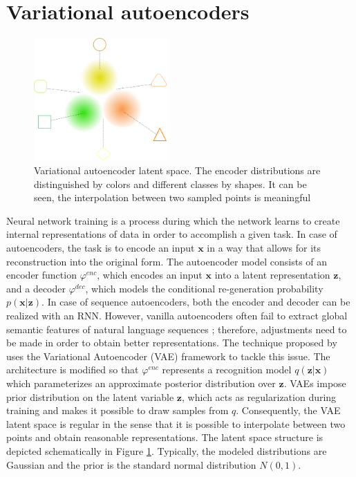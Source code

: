 \section{Variational autoencoders}
\label{background:vae}
\begin{figure}[t]
    \centering
    \includegraphics[width=0.46\textwidth]{images/VAE.png}
    \caption{Variational autoencoder latent space. The encoder distributions are distinguished by colors and different classes by shapes. It can be seen, the interpolation between two sampled points is meaningful}
    \label{fig:vae}
\end{figure}
Neural network training is a process during which the network learns to create internal representations of data in order to accomplish a given task.
In case of autoencoders, the task is to encode an input $\mathbf{x}$ in a way that allows for its reconstruction into the original form.
The autoencoder model consists of an encoder function $\varphi^{enc}$, which encodes an input $\mathbf{x}$ into a latent representation $\mathbf{z}$, and a decoder $\varphi^{dec}$, which models the conditional re-generation probability $p(\mathbf{x}|\mathbf{z})$.
In case of sequence autoencoders, both the encoder and decoder can be realized with an RNN.
However, vanilla autoencoders often fail to extract global semantic features of natural language sequences \cite{bowman2015generating}; therefore, adjustments need to be made in order to obtain better representations.
The technique proposed by \citet{kingma2013auto} uses the Variational Autoencoder (VAE) framework to tackle this issue.
The architecture is modified so that $\varphi^{enc}$ represents a recognition model $q(\mathbf{z}|\mathbf{x})$ which parameterizes an approximate posterior distribution over $\mathbf{z}$.
VAEs impose prior distribution on the latent variable $\mathbf{z}$, which acts as regularization during training and makes it possible to draw samples from $q$.
Consequently, the VAE latent space is regular in the sense that it is possible to interpolate between two points and obtain reasonable representations.
The latent space structure is depicted schematically in Figure \ref{fig:vae}.
Typically, the modeled distributions are Gaussian and the prior is the standard normal distribution $N(0, 1)$.

